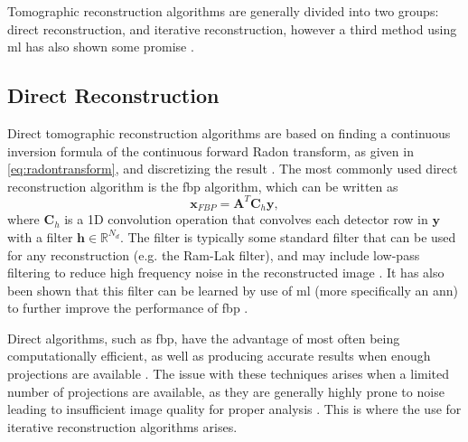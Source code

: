 Tomographic reconstruction algorithms are generally divided into two groups: direct reconstruction, and iterative reconstruction, however a third method using \acrshort{ml} has also shown some promise \cite{GANrec}.

\subsection{Direct Reconstruction}
Direct tomographic reconstruction algorithms are based on finding a continuous inversion formula of the continuous forward Radon transform, as given in \cref{eq:radontransform}, and discretizing the result \cite{jimaging4110128}. The most commonly used direct reconstruction algorithm is the \acrfull{fbp} algorithm, which can be written as \cite{jimaging4110128}
\begin{equation}
    \label{eq:fbp}
    \bm{x}_{FBP} = \bm{A}^T \bm{C}_h \bm{y},
\end{equation}
where $\bm{C}_h$ is a 1D convolution operation that convolves each detector row in $\bm{y}$ with a filter $\bm{h} \in \mathbb{R}^{N_d}$. The filter is typically some standard filter that can be used for any reconstruction (e.g. the Ram-Lak filter), and may include low-pass filtering to reduce high frequency noise in the reconstructed image \cite{681991}. It has also been shown that this filter can be learned by use of \acrshort{ml} (more specifically an \acrshort{ann}) to further improve the performance of \acrshort{fbp} \cite{6607157}. 

Direct algorithms, such as \acrshort{fbp}, have the advantage of most often being computationally efficient, as well as producing accurate results when enough projections are available \cite{jimaging4110128}. The issue with these techniques arises when a limited number of projections are available, as they are generally highly prone to noise leading to insufficient image quality for proper analysis \cite{jimaging4110128}. This is where the use for iterative reconstruction algorithms arises.

